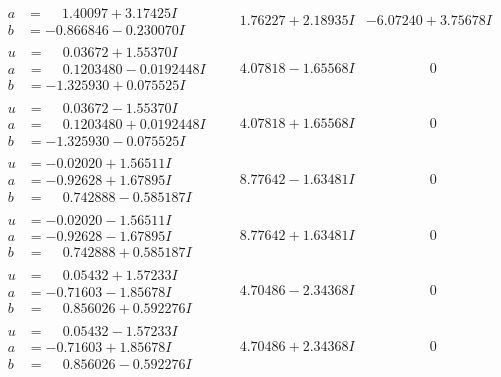 \documentclass[1p]{elsarticle_modified}
\theoremstyle{definition}
\begin{document}
$$\begin{array}{c|c|c}
\begin{aligned}
a &= \phantom{-}1.40097 + 3.17425 I \\
b &= -0.866846 - 0.230070 I\end{aligned}
 & \phantom{-}1.76227 + 2.18935 I & -6.07240 + 3.75678 I \\ \hline\begin{aligned}
u &= \phantom{-}0.03672 + 1.55370 I \\
a &= \phantom{-}0.1203480 - 0.0192448 I \\
b &= -1.325930 + 0.075525 I\end{aligned}
 & \phantom{-}4.07818 - 1.65568 I & \phantom{-0.000000 } 0 \\ \hline\begin{aligned}
u &= \phantom{-}0.03672 - 1.55370 I \\
a &= \phantom{-}0.1203480 + 0.0192448 I \\
b &= -1.325930 - 0.075525 I\end{aligned}
 & \phantom{-}4.07818 + 1.65568 I & \phantom{-0.000000 } 0 \\ \hline\begin{aligned}
u &= -0.02020 + 1.56511 I \\
a &= -0.92628 + 1.67895 I \\
b &= \phantom{-}0.742888 - 0.585187 I\end{aligned}
 & \phantom{-}8.77642 - 1.63481 I & \phantom{-0.000000 } 0 \\ \hline\begin{aligned}
u &= -0.02020 - 1.56511 I \\
a &= -0.92628 - 1.67895 I \\
b &= \phantom{-}0.742888 + 0.585187 I\end{aligned}
 & \phantom{-}8.77642 + 1.63481 I & \phantom{-0.000000 } 0 \\ \hline\begin{aligned}
u &= \phantom{-}0.05432 + 1.57233 I \\
a &= -0.71603 - 1.85678 I \\
b &= \phantom{-}0.856026 + 0.592276 I\end{aligned}
 & \phantom{-}4.70486 - 2.34368 I & \phantom{-0.000000 } 0 \\ \hline\begin{aligned}
u &= \phantom{-}0.05432 - 1.57233 I \\
a &= -0.71603 + 1.85678 I \\
b &= \phantom{-}0.856026 - 0.592276 I\end{aligned}
 & \phantom{-}4.70486 + 2.34368 I & \phantom{-0.000000 } 0\\

\end{array}$$
\end{document}
